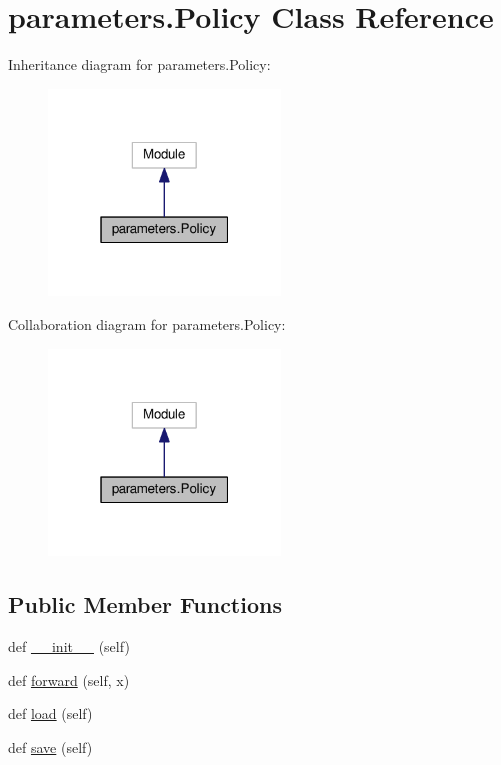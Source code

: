 \hypertarget{classparameters_1_1_policy}{}\section{parameters.\+Policy Class Reference}
\label{classparameters_1_1_policy}


Inheritance diagram for parameters.\+Policy\+:
\nopagebreak
\begin{figure}[H]
\begin{center}
\leavevmode
\includegraphics[width=175pt]{classparameters_1_1_policy__inherit__graph}
\end{center}
\end{figure}


Collaboration diagram for parameters.\+Policy\+:
\nopagebreak
\begin{figure}[H]
\begin{center}
\leavevmode
\includegraphics[width=175pt]{classparameters_1_1_policy__coll__graph}
\end{center}
\end{figure}
\subsection*{Public Member Functions}
\begin{DoxyCompactItemize}
\item 
def \hyperlink{classparameters_1_1_policy_aa8677aca39886b8bfd5a9a8ccbfad1b4}{\+\_\+\+\_\+init\+\_\+\+\_\+} (self)
\item 
def \hyperlink{classparameters_1_1_policy_a4b9846f106453eaeb5c57ec9f7cd78ad}{forward} (self, x)
\item 
def \hyperlink{classparameters_1_1_policy_a51edd8e12d87a4271641c56e74af8466}{load} (self)
\item 
def \hyperlink{classparameters_1_1_policy_a3aaf515f28cdf3c651c0aead45519e40}{save} (self)
\end{DoxyCompactItemize}
